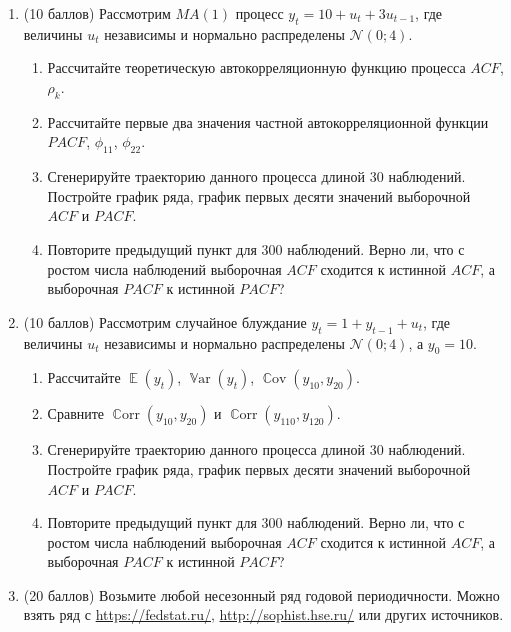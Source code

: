 \documentclass[12pt]{article}
\DeclareMathOperator{\Cov}{\mathbb{C}ov}
\DeclareMathOperator{\Corr}{\mathbb{C}orr}
\DeclareMathOperator{\Var}{\mathbb{V}ar}
\DeclareMathOperator{\E}{\mathbb{E}}
\newcommand \cN{\mathcal{N}}
\begin{document}
\begin{enumerate}

\item (10 баллов) Рассмотрим $MA(1)$ процесс $y_t = 10 + u_t + 3 u_{t-1}$, где величины $u_t$ независимы и нормально распределены 
$\cN(0;4)$.

\begin{enumerate}
    \item Рассчитайте теоретическую автокорреляционную функцию процесса $ACF$, $\rho_k$.
    \item Рассчитайте первые два значения частной автокорреляционной функции $PACF$, $\phi_{11}$, $\phi_{22}$.
    \item Сгенерируйте траекторию данного процесса длиной 30 наблюдений. 
    Постройте график ряда, график первых десяти значений выборочной $ACF$ и $PACF$. 
    \item Повторите предыдущий пункт для 300 наблюдений. 
    Верно ли, что с ростом числа наблюдений выборочная $ACF$ сходится к истинной $ACF$, а выборочная $PACF$ к истинной $PACF$?
\end{enumerate}


\item  (10 баллов) Рассмотрим случайное блуждание $y_t = 1 + y_{t-1} + u_t$, где величины $u_t$ независимы и нормально распределены 
$\cN(0;4)$, а $y_0 = 10$.

\begin{enumerate}
    \item Рассчитайте $\E(y_t)$, $\Var(y_t)$, $\Cov(y_{10}, y_{20})$.
    \item Сравните $\Corr(y_{10}, y_{20})$ и $\Corr(y_{110}, y_{120})$.
    \item Сгенерируйте траекторию данного процесса длиной 30 наблюдений. 
    Постройте график ряда, график первых десяти значений выборочной $ACF$ и $PACF$. 
    \item Повторите предыдущий пункт для 300 наблюдений. 
    Верно ли, что с ростом числа наблюдений выборочная $ACF$ сходится к истинной $ACF$, а выборочная $PACF$ к истинной $PACF$?
\end{enumerate}


\item (20 баллов)  Возьмите любой несезонный ряд годовой периодичности. 
Можно взять ряд с \url{https://fedstat.ru/}, \url{http://sophist.hse.ru/} или других источников. 


\end{enumerate}
\end{document}
